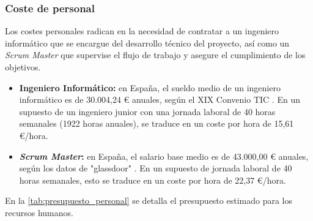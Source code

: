 \documentclass[12pt,a4paper,onecolumn,oneside]{report}
\begin{document}
\subsubsection{Coste de personal}
\label{Coste de personal}
Los costes personales radican en la necesidad de contratar a un ingeniero informático que se encargue del
desarrollo técnico del proyecto, así como un \textit{Scrum Master} que supervise el flujo de trabajo 
y asegure el cumplimiento de los objetivos. 

\begin{itemize}
  \item \textbf{Ingeniero Informático:} en España, el sueldo medio de un ingeniero informático es de 30.004,24 \euro{} anuales, según 
  el XIX Convenio TIC \cite{ilerna_sueldo_ingeniero}. En un supuesto de un ingeniero junior con una jornada laboral de 40 horas semanales (1922 horas anuales), se traduce en un coste por hora de 
  15,61 \euro{}/hora.
  \item \textbf{\textit{Scrum Master}:} en España, el salario base medio es de 43.000,00 \euro{} anuales, según los
  datos de "glassdoor" \cite{glassdoor_scrum_master}. En un supuesto de jornada laboral de 40 horas semanales, esto se traduce en un coste por hora de 
  22,37 \euro{}/hora.
\end{itemize}

En la \autoref{tab:presupuesto_personal} se detalla el presupuesto estimado para los recursos humanos.

\begin{table}[H]
\caption{Presupuesto para los recursos humanos}
\label{tab:presupuesto_personal}
\centering
{}

\end{table}

\end{document}
